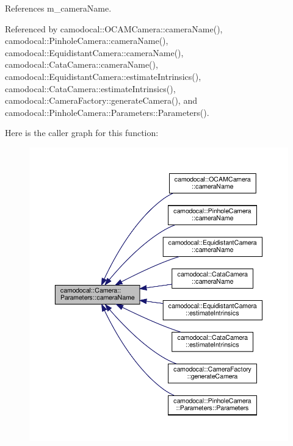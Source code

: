 References m\+\_\+camera\+Name.



Referenced by camodocal\+::\+O\+C\+A\+M\+Camera\+::camera\+Name(), camodocal\+::\+Pinhole\+Camera\+::camera\+Name(), camodocal\+::\+Equidistant\+Camera\+::camera\+Name(), camodocal\+::\+Cata\+Camera\+::camera\+Name(), camodocal\+::\+Equidistant\+Camera\+::estimate\+Intrinsics(), camodocal\+::\+Cata\+Camera\+::estimate\+Intrinsics(), camodocal\+::\+Camera\+Factory\+::generate\+Camera(), and camodocal\+::\+Pinhole\+Camera\+::\+Parameters\+::\+Parameters().

Here is the caller graph for this function\+:\nopagebreak
\begin{figure}[H]
\begin{center}
\leavevmode
\includegraphics[width=350pt]{classcamodocal_1_1Camera_1_1Parameters_ad5d799e6367c5605907a941b2271e271_icgraph}
\end{center}
\end{figure}
\mbox{\label{classcamodocal_1_1Camera_1_1Parameters_ab1ca64ed9b9555a802c2e25c7148744b}} 
